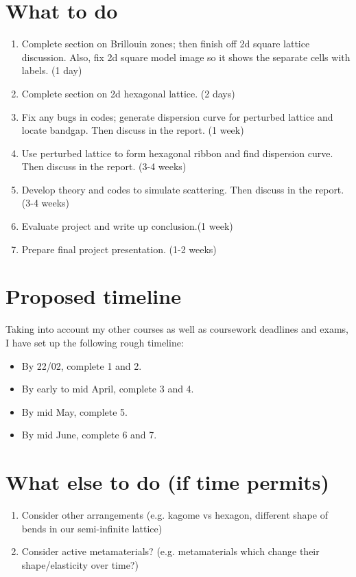 \section{What to do}
\begin{enumerate}
  \item Complete section on Brillouin zones; then finish off 2d square
        lattice discussion. Also, fix 2d square model image so it shows the
        separate cells with labels. (1 day)
  \item Complete section on 2d hexagonal lattice. (2 days)
  \item Fix any bugs in codes; generate dispersion curve for perturbed lattice
        and locate bandgap. Then discuss in the report. (1 week)
  \item Use perturbed lattice to form hexagonal ribbon and find dispersion
        curve. Then discuss in the report. (3-4 weeks)  
  \item Develop theory and codes to simulate scattering. Then discuss in the
        report. (3-4 weeks)
  \item Evaluate project and write up conclusion.(1 week)
  \item Prepare final project presentation. (1-2 weeks)
\end{enumerate}

\section{Proposed timeline}
Taking into account my other courses as well as coursework deadlines and exams,
I have set up the following rough timeline:
\begin{itemize}
  \item By 22/02, complete 1 and 2.
  \item By early to mid April, complete 3 and 4.
  \item By mid May, complete 5.
  \item By mid June, complete 6 and 7.
\end{itemize}

\section{What else to do (if time permits)}
\begin{enumerate}
  \item Consider other arrangements (e.g. kagome vs hexagon, different shape of
        bends in our semi-infinite lattice)
  \item Consider active metamaterials? (e.g. metamaterials which change their
        shape/elasticity over time?)
\end{enumerate}


